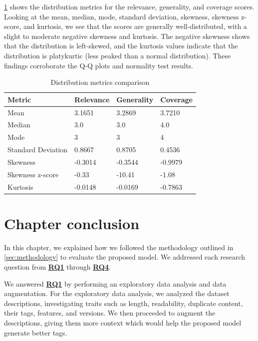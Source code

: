 \cref{tab:distribution_comparison} shows the distribution metrics for the relevance, generality, and coverage scores. Looking at the mean, median, mode, standard deviation, skewness, skewness z-score, and kurtosis, we see that the scores are generally well-distributed, with a slight to moderate negative skewness and kurtosis. The negative skewness shows that the distribution is left-skewed, and the kurtosis values indicate that the distribution is platykurtic (less peaked than a normal distribution). These findings corroborate the Q-Q plots and normality test results.

\begin{table}[htbp]
    \centering
    \caption{Distribution metrics comparison}
    \begin{tabular}{llll}
        \hline
        \textbf{Metric} & \textbf{Relevance} & \textbf{Generality} & \textbf{Coverage} \\
        \hline
        Mean & 3.1651 & 3.2869 & 3.7210 \\
        Median & 3.0 & 3.0 & 4.0 \\
        Mode & 3 & 3 & 4 \\
        Standard Deviation & 0.8667 & 0.8705 & 0.4536 \\
        Skewness & -0.3014 & -0.3544 & -0.9979 \\
        Skewness z-score & -0.33 & -10.41 & -1.08 \\
        Kurtosis & -0.0148 & -0.0169 & -0.7863 \\
        \hline
    \end{tabular}
    \label{tab:distribution_comparison}
\end{table}

\section{Chapter conclusion}
In this chapter, we explained how we followed the methodology outlined in \cref{sec:methodology} to evaluate the proposed model. We addressed each research question from \hyperref[rq1]{\textbf{RQ1}} through \hyperref[rq4]{\textbf{RQ4}}.

We answered \hyperref[rq1]{\textbf{RQ1}} by performing an exploratory data analysis and data augmentation. For the exploratory data analysis, we analyzed the dataset descriptions, investigating traits such as length, readability, duplicate content, their tags, features, and versions. We then proceeded to augment the descriptions, giving them more context which would help the proposed model generate better tags.

